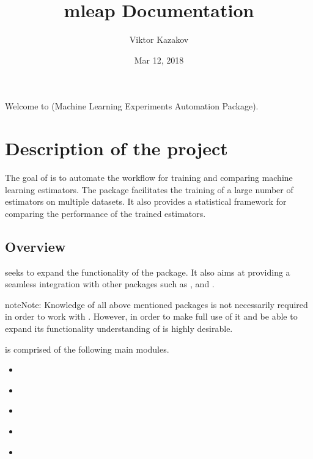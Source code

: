 \documentclass[letterpaper,10pt,english]{sphinxmanual}
\title{mleap Documentation}
\date{Mar 12, 2018}
\author{Viktor Kazakov}
\begin{document}
\maketitle
\sphinxtableofcontents
{}\label{\detokenize{index::doc}}


Welcome to  (Machine Learning Experiments Automation Package).


\chapter{Description of the project}
\label{\detokenize{project::doc}}\label{\detokenize{project:welcome-to-mleap-s-documentation}}\label{\detokenize{project:description-of-the-project}}
The goal of  is to automate the workflow for training and comparing machine learning estimators. The package facilitates the training of a large number of estimators on multiple datasets. It also provides a statistical framework for comparing the performance of the trained estimators.


\section{Overview}
\label{\detokenize{project:overview}}
 seeks to expand the functionality of the  package. It also aims at providing a seamless integration with other packages such as ,  and .

\begin{sphinxadmonition}{note}{Note:}
Knowledge of all above mentioned packages is not necessarily required in order to work with . However, in order to make full use of it and be able to expand its functionality understanding of  is highly desirable.
\end{sphinxadmonition}

 is comprised of the following main modules.
\begin{itemize}
\item {} 
{\hyperref[\detokenize{estimators:estimators}]{}}

\item {} 
{\hyperref[\detokenize{data:data}]{}}

\item {} 
{\hyperref[\detokenize{experiments:experiments}]{}}

\item {} 
{\hyperref[\detokenize{analyze_results:analyze-results}]{}}

\item {} 
{\hyperref[\detokenize{shared:shared}]{}}

\end{itemize}
\end{document}
